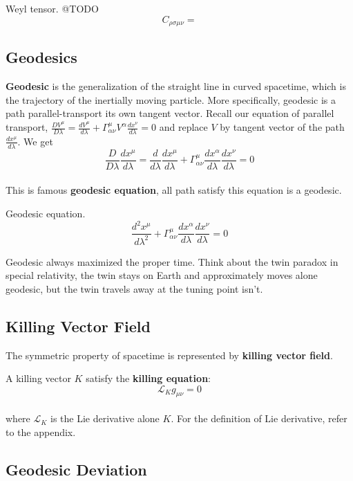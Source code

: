 \documentclass[12pt]{article}
\theoremstyle{mystyle}{\newtheorem{definition}{Definition}[section]}
\theoremstyle{mystyle}{\newtheorem{theorem}[definition]{Theorem}}
\theoremstyle{mystyle}{\newtheorem*{remark}{Remark}}
\theoremstyle{mystyle}{\newtheorem*{example}{Example}}
\theoremstyle{mystyle}{\newtheorem*{examples}{Examples}}
\theoremstyle{cstyle}{\newtheorem*{cthm}{}}
\begin{document}
\begin{definition}
  Weyl tensor. @TODO
  \[C_{\rho\sigma\mu\nu} = \]
\end{definition}
\subsection{Geodesics}

\textbf{Geodesic} is the generalization of the straight line in curved spacetime, which is the trajectory of the inertially moving particle.
More specifically, geodesic is a path parallel-transport its own tangent vector.
Recall our equation of parallel transport, \(\frac{DV^{\mu}}{D\lambda} =
\frac{dV^{\mu}}{d\lambda}+ \Gamma^{\mu}_{\alpha\nu}V^{\alpha}\frac{dx^{\nu}}{d\lambda} = 0\) and replace \(V\)
by tangent vector of the path \(\frac{dx^{\mu}}{d\lambda}\). We get
\[\frac{D}{D\lambda}\frac{dx^{\mu}}{d\lambda} =
  \frac{d}{d\lambda}\frac{dx^{\mu}}{d\lambda}+ \Gamma^{\mu}_{\alpha\nu}\frac{dx^{\alpha}}{d\lambda}\frac{dx^{\nu}}{d\lambda} = 0\]\\
This is famous \textbf{geodesic equation}, all path satisfy this equation is a geodesic.

\begin{definition}
  Geodesic equation.
  \[\frac{d^2 x^{\mu}}{d\lambda^2}+ \Gamma^{\mu}_{\alpha\nu}\frac{dx^{\alpha}}{d\lambda}\frac{dx^{\nu}}{d\lambda} = 0\]
\end{definition}

Geodesic always maximized the proper time. Think about the twin paradox in special relativity, the twin stays on Earth and approximately moves alone geodesic,
but the twin travels away at the tuning point isn't.

\subsection{Killing Vector Field}
The symmetric property of spacetime is represented by \textbf{killing vector field}.
\begin{definition}
  A killing vector \(K\) satisfy the \textbf{killing equation}:\\
  \[\mathcal{L}_{K}g_{\mu\nu}= 0\]\\
  where \(\mathcal{L}_{K}\) is the Lie derivative alone \(K\). For the definition of Lie derivative, refer to the appendix.
\end{definition}


\subsection{Geodesic Deviation}
\end{document}
